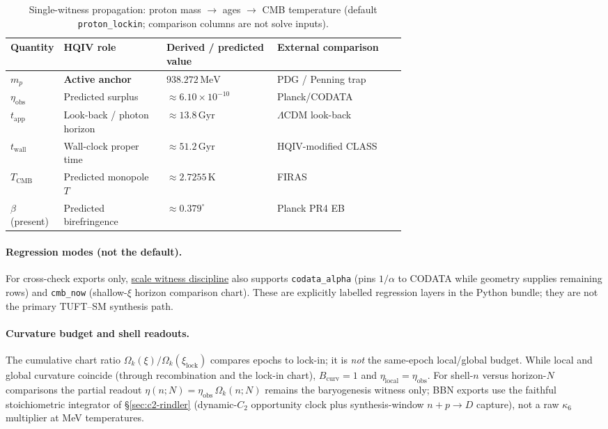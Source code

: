 \documentclass[11pt]{amsart}
\begin{document}
\begin{table}[ht]
  \centering
  \caption{Single-witness propagation: proton mass $\to$ ages $\to$ CMB temperature (default \texttt{proton\_lockin}; comparison columns are not solve inputs).}
  \label{tab:scale-witness-chain}
  \footnotesize
  \begin{tabularx}{\linewidth}{@{}>{\raggedright\arraybackslash}p{0.12\linewidth}>{\raggedright\arraybackslash}p{0.26\linewidth}>{\raggedright\arraybackslash}p{0.28\linewidth}X@{}}
    \toprule
    Quantity & HQIV role & Derived / predicted value & External comparison \\
    \midrule
    $m_p$ & \textbf{Active anchor} & $938.272\,\mathrm{MeV}$ & PDG / Penning trap \\
    $\eta_{\mathrm{obs}}$ & Predicted surplus & $\approx 6.10\times 10^{-10}$ & Planck/CODATA \\
    $t_{\mathrm{app}}$ & Look-back / photon horizon & $\approx 13.8\,\mathrm{Gyr}$ & $\Lambda$CDM look-back \\
    $t_{\mathrm{wall}}$ & Wall-clock proper time & $\approx 51.2\,\mathrm{Gyr}$ & HQIV-modified CLASS \\
    $T_{\mathrm{CMB}}$ & Predicted monopole $T$ & $\approx 2.7255\,\mathrm{K}$ & FIRAS \\
    $\beta$ (present) & Predicted birefringence & $\approx 0.379^\circ$ & Planck PR4 EB \\
    \bottomrule
  \end{tabularx}
\end{table}

\paragraph{Regression modes (not the default).}
For cross-check exports only, \hyperref[lean:scale-witness]{scale witness discipline} also supports \texttt{codata\_alpha} (pins $1/\alpha$ to CODATA while geometry supplies remaining rows) and \texttt{cmb\_now} (shallow-$\xi$ horizon comparison chart). These are explicitly labelled regression layers in the Python bundle; they are not the primary TUFT--SM synthesis path.

\paragraph{Curvature budget and shell readouts.}
The cumulative chart ratio $\Omega_k(\xi)/\Omega_k(\xi_{\mathrm{lock}})$ compares epochs to lock-in; it is \emph{not} the same-epoch local/global budget. While local and global curvature coincide (through recombination and the lock-in chart), $B_{\mathrm{curv}}=1$ and $\eta_{\mathrm{local}}=\eta_{\mathrm{obs}}$. For shell-$n$ versus horizon-$N$ comparisons the partial readout
$\eta(n;N)=\eta_{\mathrm{obs}}\,\Omega_k(n;N)$
remains the baryogenesis witness only; BBN exports use the faithful stoichiometric integrator of \S\ref{sec:c2-rindler} (dynamic-$C_2$ opportunity clock plus synthesis-window $n\!+\!p\!\to\!D$ capture), not a raw $\kappa_6$ multiplier at MeV temperatures.
\end{document}
